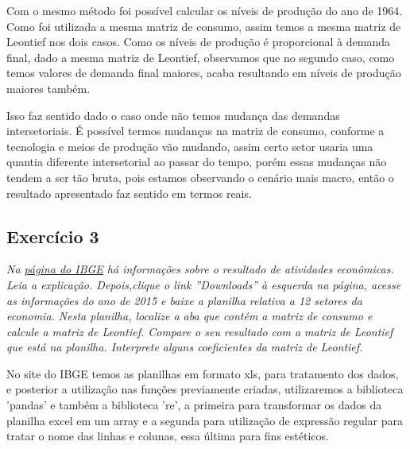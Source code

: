 \documentclass[a4paper, 12pt]{article}
\begin{document}
Com o mesmo método foi possível calcular os níveis de produção do ano de 1964. Como foi utilizada a mesma matriz de consumo, assim temos a mesma matriz de Leontief nos dois casos. Como os níveis de produção é proporcional à demanda final, dado a mesma matriz de Leontief, observamos que no segundo caso, como temos valores de demanda final maiores, acaba resultando em níveis de produção maiores também.

Isso faz sentido dado o caso onde não temos mudança das demandas intersetoriais. É possível termos mudanças na matriz de consumo, conforme a tecnologia e meios de produção vão mudando, assim certo setor usaria uma quantia diferente intersetorial ao passar do tempo, porém essas mudanças não tendem a ser tão bruta, pois estamos observando o cenário mais macro, então o resultado apresentado faz sentido em termos reais.

\subsection{Exercício 3}

\textit{Na
\href{https://www.ibge.gov.br/estatisticas/economicas/contas-nacionais/9085-matriz-de-insumo-produto.html}{página do IBGE}
há informações sobre o resultado de atividades econômicas.  Leia a explicação.  Depois,clique o link ”Downloads” à esquerda na página, acesse as informações do ano de 2015 e baixe a planilha relativa a 12 setores da economia. Nesta planilha, localize a aba que contém a matriz de consumo e calcule a matriz de Leontief.  Compare o seu resultado com a matriz de Leontief que está na planilha.  Interprete alguns coeficientes da matriz de Leontief.}

No site do IBGE temos as planilhas em formato xls, para tratamento dos dados, e posterior a utilização nas funções previamente criadas, utilizaremos a biblioteca 'pandas' e também a biblioteca 're', a primeira para transformar os dados da planilha excel em um array e a segunda para utilização de expressão regular para tratar o nome das linhas e colunas, essa última para fins estéticos.
\end{document}
